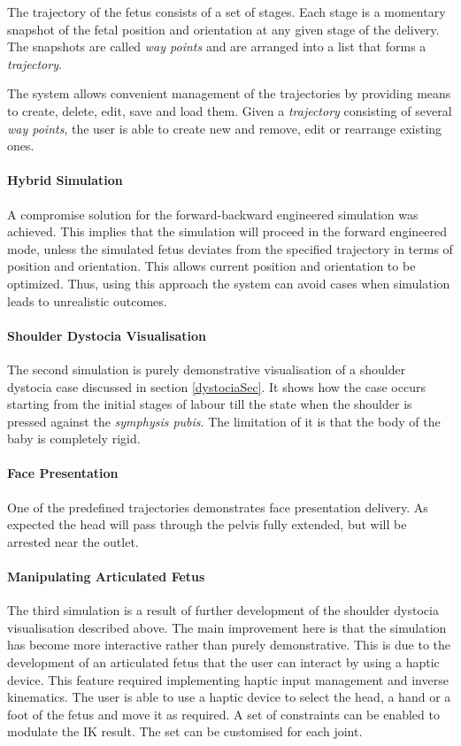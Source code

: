 The trajectory of the fetus consists of a set of stages. Each stage is a momentary snapshot of the fetal position and orientation at any given stage of the delivery. The snapshots are called \emph{way points} and are arranged into a list that forms a \emph{trajectory}.

The system allows convenient management of the trajectories by providing means to create, delete, edit, save and load them. Given a \emph{trajectory} consisting of several \emph{way points}, the user is able to create new and  remove, edit or rearrange existing ones.

\paragraph{Hybrid Simulation}
A compromise solution for the forward-backward engineered simulation was achieved. This implies that the simulation will proceed in the forward engineered mode, unless the simulated fetus deviates from the specified trajectory in terms of position and orientation. This allows current position and orientation to be optimized. Thus, using this approach the system can avoid cases when simulation leads to unrealistic outcomes.

\paragraph{Shoulder Dystocia Visualisation}
The second simulation is purely demonstrative visualisation of a shoulder dystocia case discussed in section \ref{dystociaSec}. It shows how the case occurs starting from the initial stages of labour till the state when the shoulder is pressed against the \emph{symphysis pubis}. The limitation of it is that the body of the baby is completely rigid.

\paragraph{Face Presentation}
One of the predefined trajectories demonstrates face presentation delivery. As expected the head will pass through the pelvis fully extended, but will be arrested near the outlet.

\paragraph{Manipulating Articulated Fetus}
The third simulation is a result of further development of the shoulder dystocia visualisation described above. The main improvement here is that the simulation has become more interactive rather than purely demonstrative. This is due to the development of an articulated fetus that the user can interact by using a haptic device. This feature required implementing haptic input management and inverse kinematics. The user is able to use a haptic device to select the head, a hand or a foot of the fetus and move it as required. A set of constraints can be enabled to modulate the IK result. The set can be customised for each joint.

